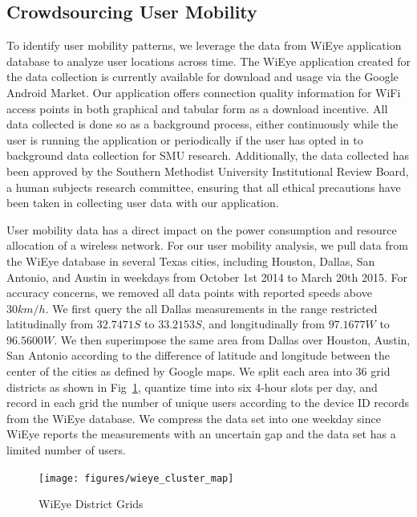 \subsection{Crowdsourcing User Mobility}
\label{subsec:mob_measurements}
To identify user mobility patterns, we leverage the data from WiEye application database to analyze user locations across time.
The WiEye application created for the data collection is currently available for download and usage via the Google Android Market. 
Our application offers connection quality information for WiFi access points in both graphical and tabular form as a download incentive. 
All data collected is done so as a background process, either continuously while the user is running the application or periodically if the user has opted in to background data collection for SMU research. 
Additionally, the data collected has been approved by the Southern Methodist University Institutional Review Board, a human subjects research committee, ensuring that all ethical precautions have been taken in collecting user data with our application.


User mobility data has a direct impact on the power consumption and resource allocation of a wireless network.
For our user mobility analysis, we pull data from the WiEye database in several Texas cities, including Houston, Dallas, San Antonio, and Austin in weekdays from October 1st 2014 to March 20th 2015.
For accuracy concerns, we removed all data points with reported speeds above $30km/h$.
We first query the all Dallas measurements in the range restricted latitudinally from 
$32.7471 S$ to $33.2153 S$, and longitudinally from $97.1677 W$ to $96.5600 W$.
We then superimpose the same area from Dallas over Houston, Austin, San Antonio according to the difference of latitude and longitude between the center of the cities as defined by Google maps.
We split each area into 36 grid districts as shown in Fig~\ref{fig:wieye_map}, quantize time into six 4-hour slots per day, and record in each grid the number of unique users according to the device ID records from the WiEye database.
We compress the data set into one weekday since WiEye reports the measurements with an uncertain gap and the data set has a limited number of users.


\begin{figure}[h]
\vspace{-0.0in}
\centering
\texttt{[image: figures/wieye\_cluster\_map]}
\vspace{-0.1in}
\caption{WiEye District Grids}
\label{fig:wieye_map}
\vspace{-0.1in}
\end{figure}

